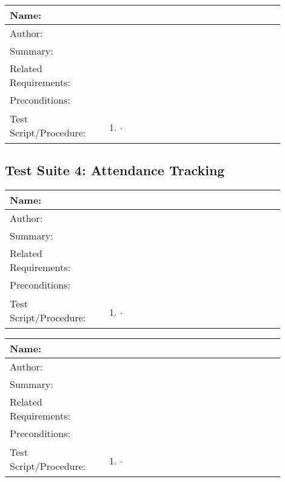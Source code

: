\documentclass[11pt]{article}
\begin{document}
\begin{table}[H]
\begin{center}
\begin{tabular}{p{0.30\linewidth}p{0.60\linewidth}}
	Name: & \\\hline
	Author: & \\\hline
	Summary: &  \\\hline
	Related Requirements:& \\\hline
	Preconditions:& \\\hline
	Test Script/Procedure: & \begin{enumerate}
	\item $\cdot$
	\end{enumerate}\\\hline
\end{tabular}
\label{des:}	
\end{center}
\end{table}

\subsection*{Test Suite 4: Attendance Tracking}

\begin{table}[H]
\begin{center}
\begin{tabular}{p{0.30\linewidth}p{0.60\linewidth}}
	Name: & \\\hline
	Author: & \\\hline
	Summary: &  \\\hline
	Related Requirements:& \\\hline
	Preconditions:& \\\hline
	Test Script/Procedure: & \begin{enumerate}
	\item $\cdot$
	\end{enumerate}\\\hline
\end{tabular}
\label{des:}	
\end{center}
\end{table}

\begin{table}[H]
\begin{center}
\begin{tabular}{p{0.30\linewidth}p{0.60\linewidth}}
	Name: & \\\hline
	Author: & \\\hline
	Summary: &  \\\hline
	Related Requirements:& \\\hline
	Preconditions:& \\\hline
	Test Script/Procedure: & \begin{enumerate}
	\item $\cdot$
	\end{enumerate}\\\hline
\end{tabular}
\label{des:}	
\end{center}
\end{table}
\end{document}
